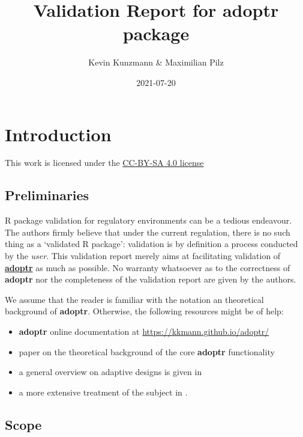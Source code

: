 \documentclass[
]{book}
\title{Validation Report for \textbf{adoptr} package}
\author{Kevin Kunzmann \& Maximilian Pilz}
\date{2021-07-20}
\providecommand{\tightlist}{%
  \setlength{\itemsep}{0pt}\setlength{\parskip}{0pt}}
\begin{document}
\maketitle

{
\setcounter{tocdepth}{1}
\tableofcontents
}
\hypertarget{introduction}{%
\chapter{Introduction}\label{introduction}}

This work is licensed under the \href{https://creativecommons.org/licenses/by-sa/4.0/deed.en}{CC-BY-SA 4.0 license}

\hypertarget{preliminaries}{%
\section{Preliminaries}\label{preliminaries}}

R package validation for regulatory environments can be a
tedious endeavour.
The authors firmly believe that under the current regulation,
there is no such thing as a `validated R package':
validation is by definition a process conducted by the \emph{user}.
This validation report merely aims at facilitating
validation of \textbf{\href{https://github.com/kkmann/adoptr}{adoptr}} as
much as possible.
No warranty whatsoever as to the correctness of \textbf{adoptr} nor the
completeness of the validation report are given by the authors.

We assume that the reader is familiar with the notation an theoretical
background of \textbf{adoptr}.
Otherwise, the following resources might be of help:

\begin{itemize}
\tightlist
\item
  \textbf{adoptr} online documentation at \url{https://kkmann.github.io/adoptr/}
\item
  paper on the theoretical background of the core \textbf{adoptr} functionality \citep{variational}
\item
  a general overview on adaptive designs is given in \citep{Bauer2015}
\item
  a more extensive treatment of the subject in \citep{Wassmer2016}.
\end{itemize}

\hypertarget{scope}{%
\section{Scope}\label{scope}}
\end{document}

